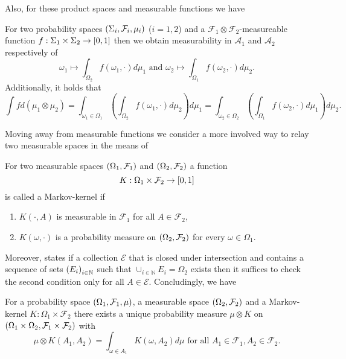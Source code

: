 Also, for these product spaces and measurable functions we have
\begin{theorem}
  \cite[Theorem 23.6]{Bauer}
  For two probability spaces $\left(\Sigma_{i}, \mathcal{F}_{i}, \mu_{i}\right)$ 
  ($i = 1,2$) and a $\mathcal{F}_{1}\otimes\mathcal{F}_{2}$-measureable 
  function $f:\Sigma_{1}\times\Sigma_{2}\rightarrow\left[0,1\right]$ then
  we obtain measurability in $\mathcal{A}_{1}$ and $\mathcal{A}_{2}$ 
  respectively of
  \begin{equation*}
    \omega_{1}\mapsto\int_{\Omega_{2}} f(\omega_{1},\cdot)d\mu_{1}
    \text{ and }
    \omega_{2}\mapsto\int_{\Omega_{1}} f(\omega_{2},\cdot)d\mu_{2}.
  \end{equation*}
  Additionally, it holds that
  \begin{equation*}
    \int f d(\mu_{1}\otimes\mu_{2}) 
    = \int_{\omega_{1}\in\Omega_{1}}(\int_{\Omega_{2}} f(\omega_{1},\cdot)
      d\mu_{2})d\mu_{1}
    = \int_{\omega_{2}\in\Omega_{2}}(\int_{\Omega_{1}} f(\omega_{2},\cdot)
      d\mu_{1})d\mu_{2}.
  \end{equation*}
  \label{thm:tonelli}
\end{theorem}

Moving away from measurable functions we consider a more involved way to relay
two measurable spaces in the means of \cite[Definition 8.25]{Klenke}
\begin{definition}
  For two measurable spaces $\left(\Omega_{1},\mathcal{F}_{1}\right)$ and 
  $\left(\Omega_{2},\mathcal{F}_{2}\right)$ a function
  \begin{equation*}
    K:\Omega_{1}\times\mathcal{F}_{2}\rightarrow\left[0,1\right]
  \end{equation*}
  is called a Markov-kernel if
  \begin{enumerate}
    \item $K(\cdot, A)$ is measurable in $\mathcal{F}_{1}$ for all 
      $A\in\mathcal{F}_{2}$,
    \item $K(\omega, \cdot)$ is a probability measure on 
      $\left(\Omega_{2},\mathcal{F}_{2}\right)$ for every $\omega\in\Omega_{1}$.
  \end{enumerate}
\end{definition}
Moreover, \cite[Remark 8.26]{Klenke} states if a collection $\mathcal{E}$ that 
is closed under intersection and contains a sequence of sets 
$\left(E_{i}\right)_{i\in\mathbb{N}}$ such that 
$\cup_{i\in\mathbb{N}}E_{i} = \Omega_{2}$ exists then it suffices to check 
the second condition only for all $A\in\mathcal{E}$. Concludingly, we have
\begin{theorem}
  \cite[Korollar 14.23]{Klenke}
  For a probability space $\left(\Omega_{1}, \mathcal{F}_{1}, \mu\right)$, a
  measurable space $\left(\Omega_{2}, \mathcal{F}_{2}\right)$ and a Markov-kernel
  $K:\Omega_{1}\times\mathcal{F}_{2}$ there exists a unique probability 
  measure $\mu\otimes K$ on $\left(\Omega_{1}\times \Omega_{2}, 
  \mathcal{F}_{1}\times\mathcal{F}_{2}\right)$ with
  \begin{equation*}
    \mu\otimes K(A_{1}, A_{2}) = \int_{\omega\in A_{1}} K(\omega, A_{2})d\mu
    \text{ for all }A_{1}\in\mathcal{F}_{1}, A_{2}\in\mathcal{F}_{2}.
  \end{equation*}
\end{theorem}
